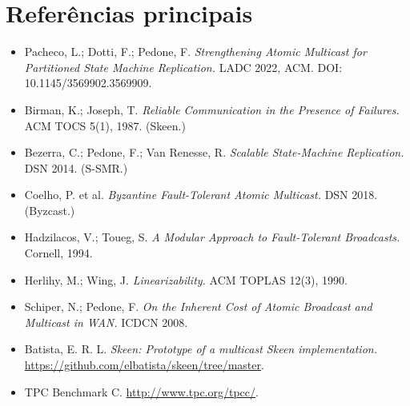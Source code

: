 \documentclass[10pt,a4paper]{article}
\begin{document}
\section*{Referências principais}
\vspace{-0.3em}
\begin{itemize}\small
\item Pacheco, L.; Dotti, F.; Pedone, F. \textit{Strengthening Atomic Multicast for Partitioned State Machine Replication.} LADC 2022, ACM. DOI: 10.1145/3569902.3569909.
\item Birman, K.; Joseph, T. \textit{Reliable Communication in the Presence of Failures.} ACM TOCS 5(1), 1987. (Skeen.)
\item Bezerra, C.; Pedone, F.; Van Renesse, R. \textit{Scalable State-Machine Replication.} DSN 2014. (S-SMR.)
\item Coelho, P. et al. \textit{Byzantine Fault-Tolerant Atomic Multicast.} DSN 2018. (Byzcast.)
\item Hadzilacos, V.; Toueg, S. \textit{A Modular Approach to Fault-Tolerant Broadcasts.} Cornell, 1994.
\item Herlihy, M.; Wing, J. \textit{Linearizability.} ACM TOPLAS 12(3), 1990.
\item Schiper, N.; Pedone, F. \textit{On the Inherent Cost of Atomic Broadcast and Multicast in WAN.} ICDCN 2008.
\item Batista, E. R. L. \textit{Skeen: Prototype of a multicast Skeen implementation.} \url{https://github.com/elbatista/skeen/tree/master}.
\item TPC Benchmark C. \url{http://www.tpc.org/tpcc/}.
\end{itemize}
\end{document}
